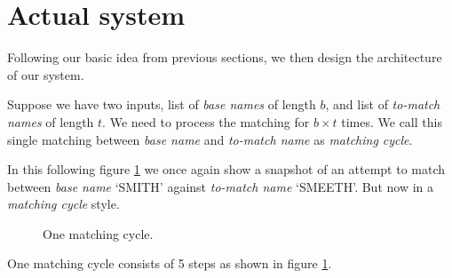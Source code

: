 \section{Actual system}
\label{sec:actualsys}

Following our basic idea from previous sections, we then design the
architecture of our system.

Suppose we have two inputs, list of \emph{base names} of length $b$,
and list of \emph{to-match names} of length $t$. We need to
process the matching for $b \times t$ times. We call this single
matching between \emph{base name} and \emph{to-match name}
as \emph{matching cycle}.

In this following figure \ref{fig:overall} we once again show a snapshot
of an attempt to match between \emph{base name} `SMITH'
against \emph{to-match name} `SMEETH'. But now in a \emph{matching cycle} style.

\begin{figure}[H]
\centering
\captionsetup{justification=centering}
\caption{One matching cycle.}
\label{fig:overall}
\end{figure}

One matching cycle consists of 5 steps as shown in figure \ref{fig:overall}.

